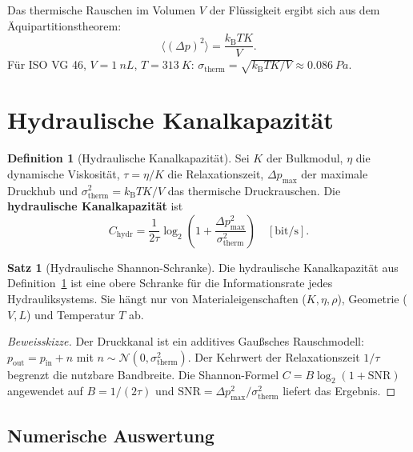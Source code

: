 ﻿\documentclass[a4paper,12pt]{scrreprt}
\theoremstyle{definition}
\newtheorem{definition}{Definition}[section]
\newtheorem{satz}{Satz}[section]
\newcommand{\kb}{k_\mathrm{B}}
\begin{document}
Das thermische Rauschen im Volumen $V$ der Flüssigkeit ergibt sich
aus dem Äquipartitionstheorem:
\[
  \langle(\Delta p)^2\rangle = \frac{\kb T K}{V}.
\]
Für ISO VG 46, $V=\SI{1}{nL}$, $T=\SI{313}{K}$:
$\sigma_{\mathrm{therm}} = \sqrt{\kb T K / V} \approx \SI{0.086}{Pa}$.

\section{Hydraulische Kanalkapazität}

\begin{definition}[Hydraulische Kanalkapazität]
  \label{def:nf5_chydr}
  Sei $K$ der Bulkmodul, $\eta$ die dynamische Viskosität,
  $\tau = \eta/K$ die Relaxationszeit, $\Delta p_{\max}$ der maximale
  Druckhub und $\sigma_{\mathrm{therm}}^2 = \kb T K / V$ das thermische
  Druckrauschen. Die \textbf{hydraulische Kanalkapazität} ist
  \[
    C_{\mathrm{hydr}} = \frac{1}{2\tau}
    \log_2\!\left(1 + \frac{\Delta p_{\max}^2}{\sigma_{\mathrm{therm}}^2}\right)
    \quad [\mathrm{bit/s}].
  \]
\end{definition}

\begin{satz}[Hydraulische Shannon-Schranke]
  Die hydraulische Kanalkapazität aus Definition~\ref{def:nf5_chydr}
  ist eine obere Schranke für die Informationsrate jedes
  Hydrauliksystems. Sie hängt nur von Materialeigenschaften
  ($K, \eta, \rho$), Geometrie ($V, L$) und Temperatur $T$ ab.
\end{satz}

\begin{proof}[Beweisskizze]
  Der Druckkanal ist ein additives Gaußsches Rauschmodell:
  $p_{\mathrm{out}} = p_{\mathrm{in}} + n$ mit
  $n \sim \mathcal{N}(0, \sigma_{\mathrm{therm}}^2)$. Der
  Kehrwert der Relaxationszeit $1/\tau$ begrenzt die nutzbare
  Bandbreite. Die Shannon-Formel $C = B\log_2(1+\mathrm{SNR})$
  angewendet auf $B=1/(2\tau)$ und $\mathrm{SNR} =
  \Delta p_{\max}^2/\sigma_{\mathrm{therm}}^2$ liefert das Ergebnis.
\end{proof}

\subsection{Numerische Auswertung}
\end{document}
